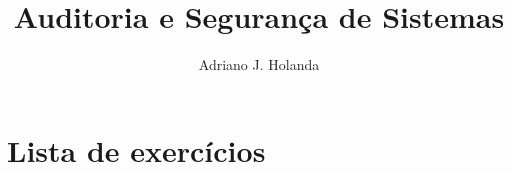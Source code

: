 \documentclass{article}
\title{Auditoria e Segurança de Sistemas}
\author{Adriano J. Holanda}
\begin{document}
\maketitle

\section*{Lista de exercícios}


\end{document}
